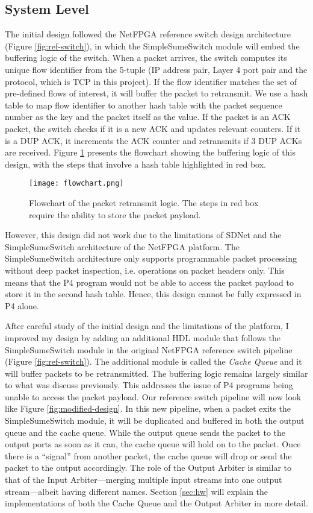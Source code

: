 \subsection{System Level}
The initial design followed the NetFPGA reference switch design architecture (Figure \ref{fig:ref-switch}), in which the SimpleSumeSwitch module will embed the buffering logic of the switch. When a packet arrives, the switch computes its unique flow identifier from the 5-tuple (IP address pair, Layer 4 port pair and the protocol, which is TCP in this project). If the flow identifier matches the set of pre-defined flows of interest, it will buffer the packet to retransmit. We use a hash table to map flow identifier to another hash table with the packet sequence number as the key and the packet itself as the value. If the packet is an ACK packet, the switch checks if it is a new ACK and updates relevant counters. If it is a DUP ACK, it increments the ACK counter and retransmits if 3 DUP ACKs are received. Figure \ref{fig:flowchart} presents the flowchart showing the buffering logic of this design, with the steps that involve a hash table highlighted in red box.

\begin{figure}[!h]
	\centering
	\texttt{[image: flowchart.png]}
	\caption{Flowchart of the packet retransmit logic. The steps in red box require the ability to store the packet payload.}
	\label{fig:flowchart}
\end{figure}

However, this design did not work due to the limitations of SDNet and the SimpleSumeSwitch architecture of the NetFPGA platform. The SimpleSumeSwitch architecture only supports programmable packet processing without deep packet inspection, i.e. operations on packet headers only. This means that the P4 program would not be able to access the packet payload to store it in the second hash table. Hence, this design cannot be fully expressed in P4 alone.

After careful study of the initial design and the limitations of the platform, I improved my design by adding an additional HDL module that follows the SimpleSumeSwitch module in the original NetFPGA reference switch pipeline (Figure \ref{fig:ref-switch}). The additional module is called the \textit{Cache Queue} and it will buffer packets to be retransmitted. The buffering logic remains largely similar to what was discuss previously. This addresses the issue of P4 programs being unable to access the packet payload. Our reference switch pipeline will now look like Figure \ref{fig:modified-design}. In this new pipeline, when a packet exits the SimpleSumeSwitch module, it will be duplicated and buffered in both the output queue and the cache queue. While the output queue sends the packet to the output ports as soon as it can, the cache queue will hold on to the packet. Once there is a ``signal'' from another packet, the cache queue will drop or send the packet to the output accordingly. The role of the Output Arbiter is similar to that of the Input Arbiter---merging multiple input streams into one output stream---albeit having different names. Section \ref{sec:hw} will explain the implementations of both the Cache Queue and the Output Arbiter in more detail.

